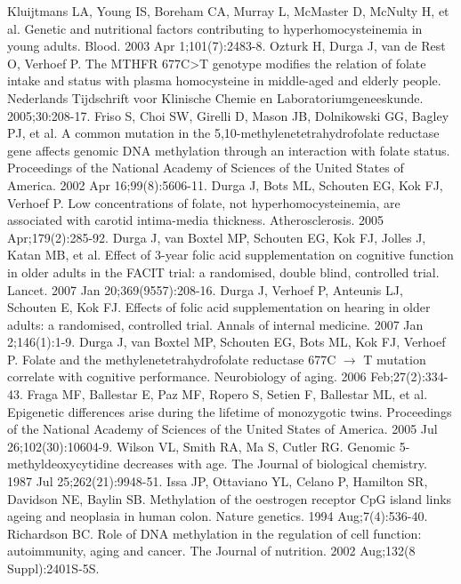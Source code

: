 \begin{thebibliography}{12}
		Kluijtmans LA, Young IS, Boreham CA, Murray L, McMaster D, McNulty H, et al. Genetic and nutritional factors contributing to hyperhomocysteinemia in young adults. Blood. 2003 Apr 1;101(7):2483-8. 
		Ozturk H, Durga J, van de Rest O, Verhoef P. The MTHFR 677C>T genotype modifies the relation of folate intake and status with plasma homocysteine in middle-aged and elderly people. Nederlands Tijdschrift voor Klinische Chemie en Laboratoriumgeneeskunde. 2005;30:208-17. 
		Friso S, Choi SW, Girelli D, Mason JB, Dolnikowski GG, Bagley PJ, et al. A common mutation in the 5,10-methylenetetrahydrofolate reductase gene affects genomic DNA methylation through an interaction with folate status. Proceedings of the National Academy of Sciences of the United States of America. 2002 Apr 16;99(8):5606-11. 
		Durga J, Bots ML, Schouten EG, Kok FJ, Verhoef P. Low concentrations of folate, not hyperhomocysteinemia, are associated with carotid intima-media thickness. Atherosclerosis. 2005 Apr;179(2):285-92. 
		Durga J, van Boxtel MP, Schouten EG, Kok FJ, Jolles J, Katan MB, et al. Effect of 3-year folic acid supplementation on cognitive function in older adults in the FACIT trial: a randomised, double blind, controlled trial. Lancet. 2007 Jan 20;369(9557):208-16. 
		Durga J, Verhoef P, Anteunis LJ, Schouten E, Kok FJ. Effects of folic acid supplementation on hearing in older adults: a randomised, controlled trial. Annals of internal medicine. 2007 Jan 2;146(1):1-9. 
		Durga J, van Boxtel MP, Schouten EG, Bots ML, Kok FJ, Verhoef P. Folate and the methylenetetrahydrofolate reductase 677C $\rightarrow$ T mutation correlate with cognitive performance. Neurobiology of aging. 2006 Feb;27(2):334-43. 
		Fraga MF, Ballestar E, Paz MF, Ropero S, Setien F, Ballestar ML, et al. Epigenetic differences arise during the lifetime of monozygotic twins. Proceedings of the National Academy of Sciences of the United States of America. 2005 Jul 26;102(30):10604-9. 
		Wilson VL, Smith RA, Ma S, Cutler RG. Genomic 5-methyldeoxycytidine decreases with age. The Journal of biological chemistry. 1987 Jul 25;262(21):9948-51. 
		Issa JP, Ottaviano YL, Celano P, Hamilton SR, Davidson NE, Baylin SB. Methylation of the oestrogen receptor CpG island links ageing and neoplasia in human colon. Nature genetics. 1994 Aug;7(4):536-40. 
		Richardson BC. Role of DNA methylation in the regulation of cell function: autoimmunity, aging and cancer. The Journal of nutrition. 2002 Aug;132(8 Suppl):2401S-5S. 

\end{thebibliography}
